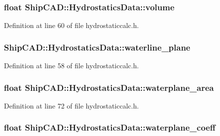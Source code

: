 \hypertarget{structShipCAD_1_1HydrostaticsData_acfbee81bded1b067a23cfc8cc9c00855}{
\subsubsection[{volume}]{\setlength{\rightskip}{0pt plus 5cm}float Ship\-C\-A\-D\-::\-Hydrostatics\-Data\-::volume}}\label{structShipCAD_1_1HydrostaticsData_acfbee81bded1b067a23cfc8cc9c00855}


Definition at line 60 of file hydrostaticcalc.\-h.

\hypertarget{structShipCAD_1_1HydrostaticsData_af93141f846f6622bb146cda042962303}{
\subsubsection[{waterline\-\_\-plane}]{ Ship\-C\-A\-D\-::\-Hydrostatics\-Data\-::waterline\-\_\-plane}}\label{structShipCAD_1_1HydrostaticsData_af93141f846f6622bb146cda042962303}


Definition at line 58 of file hydrostaticcalc.\-h.

\hypertarget{structShipCAD_1_1HydrostaticsData_a5f3432f4d790bbb9c4d75502cb15b7f0}{
\subsubsection[{waterplane\-\_\-area}]{\setlength{\rightskip}{0pt plus 5cm}float Ship\-C\-A\-D\-::\-Hydrostatics\-Data\-::waterplane\-\_\-area}}\label{structShipCAD_1_1HydrostaticsData_a5f3432f4d790bbb9c4d75502cb15b7f0}


Definition at line 72 of file hydrostaticcalc.\-h.

\hypertarget{structShipCAD_1_1HydrostaticsData_a4d5eb630367999a611b95dd0d2c2242c}{
\subsubsection[{waterplane\-\_\-coeff}]{\setlength{\rightskip}{0pt plus 5cm}float Ship\-C\-A\-D\-::\-Hydrostatics\-Data\-::waterplane\-\_\-coeff}}\label{structShipCAD_1_1HydrostaticsData_a4d5eb630367999a611b95dd0d2c2242c}


